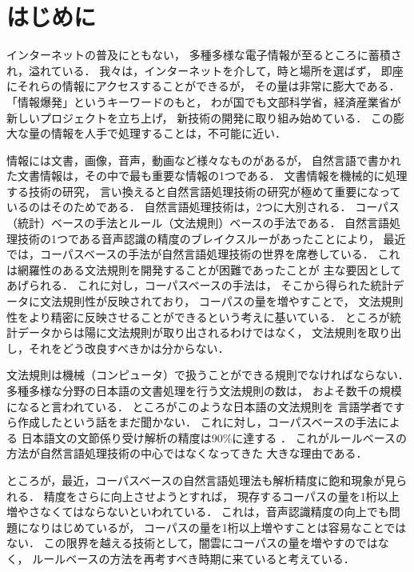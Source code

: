 \documentclass[japanese]{jnlp_1.4}
\begin{document}
\maketitle

\section{はじめに}

インターネットの普及にともない，
多種多様な電子情報が至るところに蓄積され，溢れている．
我々は，インターネットを介して，時と場所を選ばず，
即座にそれらの情報にアクセスすることができるが，
その量は非常に膨大である．
「情報爆発」というキーワードのもと，
わが国でも文部科学省，経済産業省が新しいプロジェクトを立ち上げ，
新技術の開発に取り組み始めている．
この膨大な量の情報を人手で処理することは，不可能に近い．

情報には文書，画像，音声，動画など様々なものがあるが，
自然言語で書かれた文書情報は，その中で最も重要な情報の1つである．
文書情報を機械的に処理する技術の研究，
言い換えると自然言語処理技術の研究が極めて重要になっているのはそのためである．
自然言語処理技術は，2つに大別される．
コーパス（統計）ベースの手法とルール（文法規則）ベースの手法である．
自然言語処理技術の1つである音声認識の精度のブレイクスルーがあったことにより，
最近では，コーパスベースの手法が自然言語処理技術の世界を席巻している．
これは網羅性のある文法規則を開発することが困難であったことが
主な要因としてあげられる．
これに対し，コーパスベースの手法は，
そこから得られた統計データに文法規則性が反映されており，
コーパスの量を増やすことで，
文法規則性をより精密に反映させることができるという考えに基いている．
ところが統計データからは陽に文法規則が取り出されるわけではなく，
文法規則を取り出し，それをどう改良すべきかは分からない．

文法規則は機械（コンピュータ）で扱うことができる規則でなければならない．
多種多様な分野の日本語の文書処理を行う文法規則の数は，
およそ数千の規模になると言われている．
ところがこのような日本語の文法規則を
言語学者ですら作成したという話をまだ聞かない．
これに対し，コーパスベースの手法による
日本語文の文節係り受け解析の精度は90\%に達する \cite{kudo:2002,uchimoto:99}．
これがルールベースの方法が自然言語処理技術の中心ではなくなってきた
大きな理由である．

ところが，最近，コーパスベースの自然言語処理法も解析精度に飽和現象が見られる．
精度をさらに向上させようとすれば，
現存するコーパスの量を1桁以上増やさなくてはならないといわれている．
これは，音声認識精度の向上でも問題になりはじめているが，
コーパスの量を1桁以上増やすことは容易なことではない．
この限界を越える技術として，闇雲にコーパスの量を増やすのではなく，
ルールベースの方法を再考すべき時期に来ていると考えている．
\end{document}
